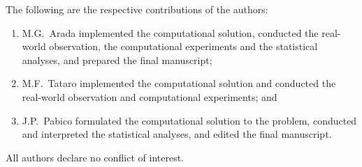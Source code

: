 \documentclass[preprint]{./acm_proc_article-sp}
\begin{document}
The following are the respective contributions of the authors: 
\begin{enumerate}
\item M.G.~Arada implemented the computational solution, conducted the real-world observation, the computational experiments and the statistical analyses, and prepared the final manuscript; 
\item M.F.~Tataro implemented the computational solution and conducted the real-world observation and computational experiments; and 
\item J.P.~Pabico formulated the computational solution to the problem, conducted and interpreted the statistical analyses, and edited the final manuscript. 
\end{enumerate}
All authors declare no conflict of interest.



\end{document}
